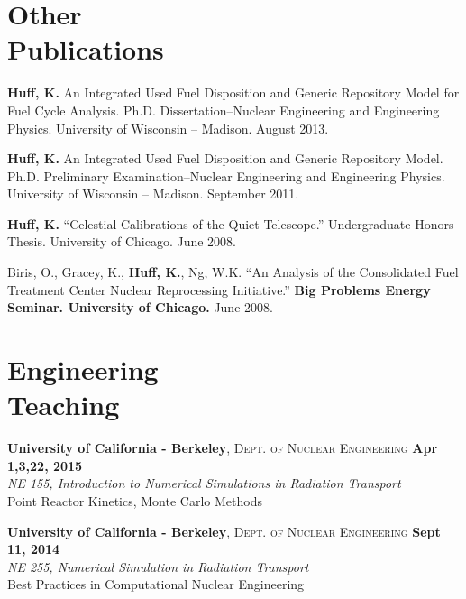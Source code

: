 \documentclass[margin,line]{resume}
\begin{document}
\begin{resume}
    \section{\mysidestyle Other\\Publications}
    \begin{bibenum}
      \item \textbf{Huff, K.} An Integrated Used Fuel Disposition and Generic Repository Model for Fuel Cycle Analysis.
        Ph.D. Dissertation--Nuclear Engineering and Engineering
        Physics. University of Wisconsin -- Madison.  August 2013.
      \item \textbf{Huff, K.} An Integrated Used Fuel Disposition and Generic Repository Model.
        Ph.D. Preliminary Examination--Nuclear Engineering and Engineering
        Physics. University of Wisconsin -- Madison.  September 2011.
      \item \textbf{Huff, K.} ``Celestial Calibrations of the Quiet Telescope.''
        Undergraduate Honors Thesis. University of Chicago. June 2008.
      \item Biris, O., Gracey, K., \textbf{Huff, K.}, Ng, W.K.
        ``An Analysis of the Consolidated Fuel Treatment Center Nuclear
        Reprocessing Initiative.''
        \textbf{Big Problems Energy Seminar. University of Chicago.} June 2008.
    \end{bibenum}
    \section{\mysidestyle Engineering\\Teaching}

    \textbf{University of California - Berkeley}, \textsc{Dept. of Nuclear Engineering} \hfill \textbf{Apr 1,3,22, 2015}\\
               \textsl{NE 155, Introduction to Numerical Simulations in Radiation Transport}\\
               Point Reactor Kinetics, Monte Carlo Methods 

    \textbf{University of California - Berkeley}, \textsc{Dept. of Nuclear Engineering} \hfill \textbf{Sept 11, 2014}\\
               \textsl{NE 255, Numerical Simulation in Radiation Transport}\\
               Best Practices in Computational Nuclear Engineering


\end{resume}
\end{document}
